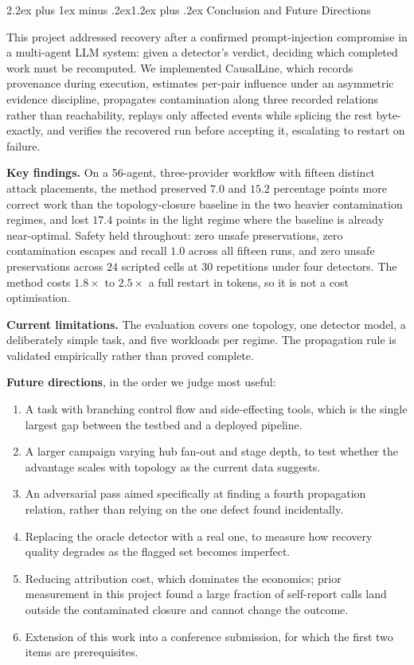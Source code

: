 \documentclass[10pt,twocolumn,a4paper]{article}
\makeatletter
\renewcommand{\section}{\@startsection{section}{1}{\z@}%
  {2.2ex plus 1ex minus .2ex}{1.2ex plus .2ex}%
  {\centering\normalfont\normalsize\scshape}}
\newcommand{\sys}{CausalLine}
\makeatother
\begin{document}
\section{Conclusion and Future Directions}
\label{sec:concl}

This project addressed recovery after a confirmed prompt-injection compromise in
a multi-agent LLM system: given a detector's verdict, deciding which completed
work must be recomputed. We implemented \sys{}, which records provenance during
execution, estimates per-pair influence under an asymmetric evidence discipline,
propagates contamination along three recorded relations rather than
reachability, replays only affected events while splicing the rest byte-exactly,
and verifies the recovered run before accepting it, escalating to restart on
failure.

\textbf{Key findings.} On a 56-agent, three-provider workflow with fifteen
distinct attack placements, the method preserved $7.0$ and $15.2$ percentage
points more correct work than the topology-closure baseline in the two heavier
contamination regimes, and lost $17.4$ points in the light regime where the
baseline is already near-optimal. Safety held throughout: zero unsafe
preservations, zero contamination escapes and recall $1.0$ across all fifteen
runs, and zero unsafe preservations across $24$ scripted cells at $30$
repetitions under four detectors. The method costs $1.8\times$ to $2.5\times$ a
full restart in tokens, so it is not a cost optimisation.

\textbf{Current limitations.} The evaluation covers one topology, one detector
model, a deliberately simple task, and five workloads per regime. The
propagation rule is validated empirically rather than proved complete.

\textbf{Future directions}, in the order we judge most useful:
\begin{enumerate}
\item A task with branching control flow and side-effecting tools, which is the
single largest gap between the testbed and a deployed pipeline.
\item A larger campaign varying hub fan-out and stage depth, to test whether the
advantage scales with topology as the current data suggests.
\item An adversarial pass aimed specifically at finding a fourth propagation
relation, rather than relying on the one defect found incidentally.
\item Replacing the oracle detector with a real one, to measure how recovery
quality degrades as the flagged set becomes imperfect.
\item Reducing attribution cost, which dominates the economics; prior
measurement in this project found a large fraction of self-report calls land
outside the contaminated closure and cannot change the outcome.
\item Extension of this work into a conference submission, for which the first
two items are prerequisites.
\end{enumerate}
\end{document}
